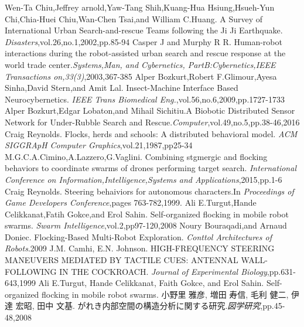 \documentclass[a4paper,11pt]{jarticle}
\begin{document}
%	
%	
	\begin{thebibliography}{99}
		 Wen-Ta Chiu,Jeffrey arnold,Yaw-Tang Shih,Kuang-Hua Hsiung,Hsueh-Yun Chi,Chia-Huei Chiu,Wan-Chen Tsai,and William C.Huang. A Survey of International Urban Search-and-rescue Teams following the Ji Ji Earthquake. \textit{Disasters},vol.26,no.1,2002,pp.85-94
		Casper J and Murphy R R. Human-robot interactions during the robot-assisted urban search and rescue response at the world trade center.\textit{Systems,Man, and Cybernetics, PartB:Cybernetics,IEEE Transactions on,33(3)},2003,367-385
		Alper Bozkurt,Robert F.Glimour,Ayesa Sinha,David Stern,and Amit Lal. Insect-Machine Interface Based Neurocybernetics. \textit{IEEE Trans Biomedical Eng.},vol.56,no.6,2009,pp.1727-1733
		Alper Bozkurt,Edgar Lobaton,and Mihail Sichitiu.A Biobotic Distributed Sensor Network for Under-Rubble Search and Rescue.\textit{Computer},vol.49,no.5,pp.38-46,2016
		Craig Reynolds. Flocks, herds and schools: A distributed behavioral model. \textit{ACM SIGGRApH Computer Graphics},vol.21,1987,pp25-34
		M.G.C.A.Cimino,A.Lazzero,G.Vaglini. Combining stgmergic and flocking behaviors to coordinate swarms of drones performing target search. \textit{International Conference on Information,Intelligence,Systems and Applications},2015,pp.1-6
		Craig Reynolds. Steering behaiviors for autonomous characters.In \textit{Proceedings of Game Developers Conference},pages 763-782,1999.
		Ali E.Turgut,Hande Celikkanat,Fatih Gokce,and Erol Sahin. Self-organized flocking in mobile robot swarms. \textit{Swarm Intelligence},vol.2,pp97-120,2008
		Noury Bouraqadi,and Arnaud Doniec. Flocking-Based Multi-Robot Exploration. \textit{Conttol Architectures of Robots}.2009
		J.M. Camhi, E.N. Johnson. HIGH-FREQUENCY STEERING MANEUVERS MEDIATED BY TACTILE CUES: ANTENNAL WALL-FOLLOWING IN THE COCKROACH. \textit{Journal of Experimental Biology},pp.631-643,1999
		Ali E.Turgut, Hande Celikkanat, Faith Gokce, and Erol Sahin. Self-organized flocking in mobile robot swarms.
		小野里 雅彦, 増田 寿信, 毛利 健二, 伊達 宏昭, 田中 文基. がれき内部空間の構造分析に関する研究.\textit{図学研究},pp.45-48,2008
		
	\end{thebibliography}
\end{document}
